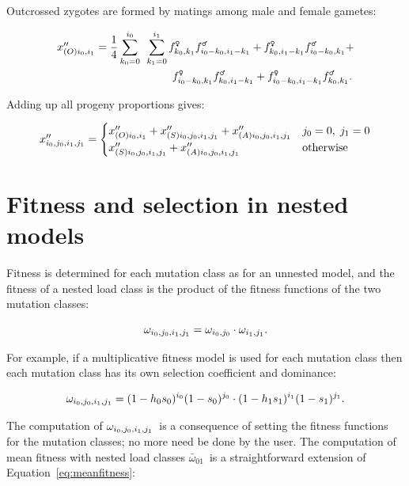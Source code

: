 \documentclass[12pt,twoside,letterpaper,fleqn]{report}
\numberwithin{equation}{section}  %
\newcommand{\wnested}{\mbox{$\omega_{i_0\/,j_0\/,i_1\/,j_1\/}$}}
\newcommand{\meanwnested}{\mbox{$\bar{\omega}_{01}$}}
\newcommand{\gammalekk}{\mbox{$f_{k_0,k_1}^{\text{\Male}}$}}
\newcommand{\gamfemalekk}{\mbox{$f_{k_0,k_1}^{\text{\Female}}$}}
\newcommand{\gammaleikik}{\mbox{$f_{i_0-k_0,i_1-k_1}^{\text{\Male}}$}}
\newcommand{\gamfemaleikik}{\mbox{$f_{i_0-k_0,i_1-k_1}^{\text{\Female}}$}}
\newcommand{\gammalekik}{\mbox{$f_{k_0,i_1-k_1}^{\text{\Male}}$}}
\newcommand{\gamfemalekik}{\mbox{$f_{k_0,i_1-k_1}^{\text{\Female}}$}}
\newcommand{\gammaleikk}{\mbox{$f_{i_0-k_0,k_1}^{\text{\Male}}$}}
\newcommand{\gamfemaleikk}{\mbox{$f_{i_0-k_0,k_1}^{\text{\Female}}$}}
\newcommand{\xppsijij}{\mbox{$x''_{(S)i_0\/,j_0\/,i_1\/,j_1\/}$}}
\newcommand{\xppaijij}{\mbox{$x''_{(A)i_0\/,j_0\/,i_1\/,j_1\/}$}}
\newcommand{\xppoii}{\mbox{$x''_{(O)i_0\/,i_1\/}$}}
\newcommand{\xppijij}{\mbox{$x''_{i_0\/,j_0\/,i_1\/,j_1\/}$}}
\begin{document}
{Outcrossed zygotes are formed by matings among male and female gametes:

\begin{equation}
\label{eq:nested:zygotes}
\begin{split}
\xppoii &= 
  \frac{1}{4}
    \sum_{k_0=0}^{i_0}{} \;
      \sum_{k_1=0}^{i_1}{}
        \gamfemalekk\gammaleikik + \gamfemalekik\gammaleikk + \\
    &   \qquad\qquad\qquad\quad \gamfemaleikk\gammalekik + \gamfemaleikik\gammalekk.
\end{split}
\end{equation}

Adding up all progeny proportions gives:

\begin{equation}
\xppijij = 
\begin{cases}
\xppoii + \xppsijij + \xppaijij  & j_0=0,\;j_1=0 \\
\xppsijij + \xppaijij            & \text{otherwise}
\end{cases}
\end{equation}

\section{Fitness and selection in nested models}

Fitness is determined for each mutation class as for an unnested model, and the
fitness of a nested load class is the product of the fitness functions of the
two mutation classes:

\begin{equation}
\wnested = \omega_{i_0,j_0} \cdot \omega_{i_1,j_1}.
\end{equation}

For example, if a multiplicative fitness model is used for each mutation class
then each mutation class has its own selection coefficient and dominance:

\begin{equation}
\wnested = (1-h_0 s_0)^{i_0}(1-s_0)^{j_0} \cdot (1-h_1 s_1)^{i_1}(1-s_1)^{j_1}.
\end{equation}

The computation of \wnested\ is a consequence of setting the fitness functions
for the mutation classes; no more need be done by the user.  The computation of
mean fitness with nested load classes \meanwnested\ is a straightforward
extension of Equation~\eqref{eq:meanfitness}:

}
\end{document}
